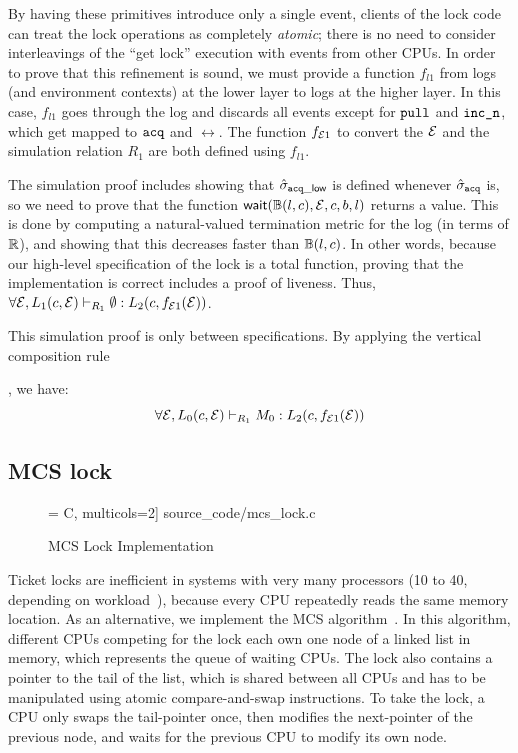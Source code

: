 {By having these primitives introduce only a single event, clients of the
lock code can treat the lock operations as completely \emph{atomic}; there is
no need to consider interleavings of the ``get lock'' execution
with events from other CPUs. In order to prove that this refinement
is sound, we must provide a function $f_{l1}$ from logs (and environment
contexts) at the lower layer to logs at the higher layer.  In this
case, $f_{l1}$ goes through the log and discards all events except for
${\texttt{pull}}$ and ${\texttt{inc\_n}}$, which get mapped to ${\texttt{acq}}$ and
$\rel$.
The function $f_{\mathcal{E}1}$ to convert the $\mathcal{E}$ 
and the simulation relation $R_1$ are both defined using $f_{l1}$.

The simulation proof
includes showing that $\hat{\sigma}_{{\texttt{acq}}\_\mathsf{low}}$ is defined whenever
$\hat{\sigma}_{{\texttt{acq}}}$ is, so we need to prove that the function
$\mathsf{wait}(\mathbb{B}(l, c), \mathcal{E}, c, b, l)$ returns a value. This is done
by computing a natural-valued termination metric for the log 
(in terms of
$\mathbb{R}$), and showing that this decreases faster than $\mathbb{B}(l,c)$. In other words,
because our high-level specification of the lock is a total function,
proving that the implementation is correct includes a proof of
liveness. Thus,
{\small 
$
\forall \mathcal{E}, 
L_1(c, \mathcal{E}) \vdash_{R_1} \emptyset : L_2(c,f_{\mathcal{E}1}(\mathcal{E}))
$}.%

This simulation proof is only between specifications.
By applying the vertical composition rule , we have:
\[
\forall \mathcal{E}, 
L_0(c,\mathcal{E}) \vdash_{R_1} M_0 : L_2(c, f_{\mathcal{E}1}(\mathcal{E}))
\]


\subsection{MCS lock}
\label{sec:con:mcs}
\begin{figure}
 = C, multicols=2] {source_code/mcs_lock.c}
\caption{MCS Lock Implementation}
\label{fig:exp:mcs_lock}
\hrulefill
\end{figure}
Ticket locks are inefficient in systems with very many processors (10
to 40, depending on workload~\cite{Boyd-wickizer12}), because every
CPU repeatedly reads the same memory location. As an alternative, we
implement the MCS algorithm~\cite{mcs91}. In this algorithm,
different CPUs competing for the lock each own one node of a
linked list in memory, which represents the queue of waiting CPUs. The
lock also contains a pointer to the tail of the list, which is shared
between all CPUs and has to be manipulated using atomic
compare-and-swap instructions. To take the lock, a CPU only
swaps the tail-pointer once, then modifies the next-pointer
of the previous node, and waits for the previous CPU to modify its own
node. 

}
